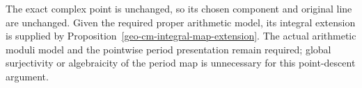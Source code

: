 The exact complex point is unchanged, so its chosen component and
original line are unchanged. Given the required proper arithmetic
model, its integral extension is supplied by
Proposition~\ref{geo-cm-integral-map-extension}.
The actual arithmetic moduli model and the pointwise period
presentation remain required; global surjectivity or algebraicity of
the period map is unnecessary for this point-descent argument.
